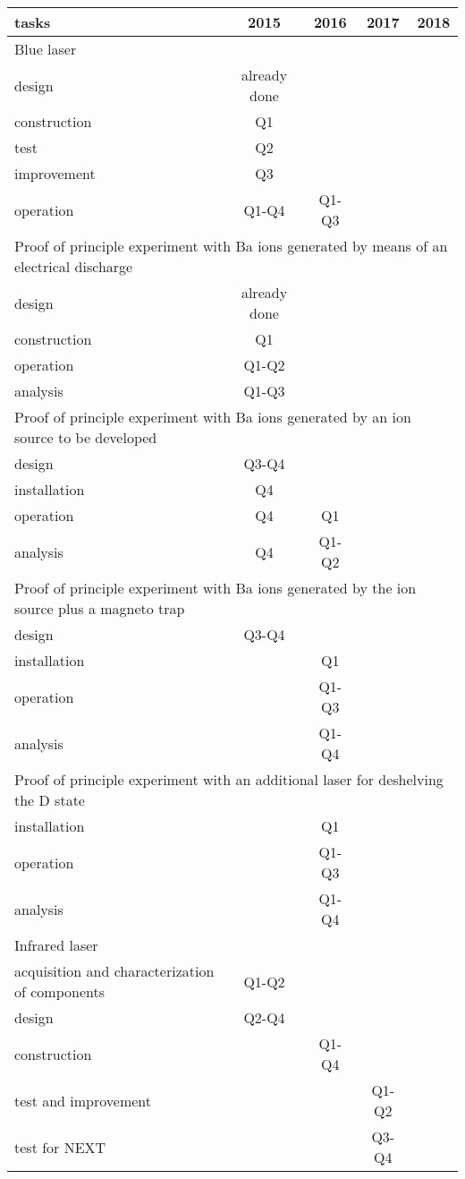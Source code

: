 \begin{center}
\begin{tabular}{| l | c | c | c | c |}
\hline
tasks & 2015 & 2016 & 2017 & 2018 \\
\hline
\hline
\multicolumn{5}{|l|}{Blue laser}  \\
\hline
\hline
design & already done & & &  \\
construction & Q1 & & & \\
test & Q2 & & & \\
improvement  & Q3 & & & \\
operation &  Q1-Q4 & Q1-Q3 & & \\
\hline
\hline
\multicolumn{5}{|l|}{Proof of principle experiment with Ba ions generated by means of an electrical discharge}  \\
\hline
\hline
design & already done & & &  \\
construction  &  Q1 & & & \\
operation &  Q1-Q2 & & & \\
analysis &  Q1-Q3 & & & \\
\hline
\hline
\multicolumn{5}{|l|}{Proof of principle experiment with Ba ions generated by an ion source to be developed}  \\
\hline
\hline
design & Q3-Q4 & & &  \\
installation  &  Q4 & & & \\
operation &  Q4 & Q1 & & \\
analysis &  Q4 & Q1-Q2 & & \\
\hline
\hline
\multicolumn{5}{|l|}{Proof of principle experiment with Ba ions generated by the ion source plus a magneto trap}  \\
\hline
\hline
design & Q3-Q4 & & &  \\
installation  &  & Q1 & & \\
operation &  & Q1-Q3 & & \\
analysis &  & Q1-Q4 & & \\
\hline
\hline
\multicolumn{5}{|l|}{Proof of principle experiment with an additional laser for deshelving the D state}  \\
\hline
\hline
installation  &  & Q1 & & \\
operation &  & Q1-Q3 & & \\
analysis &  & Q1-Q4 & & \\
\hline
\hline
\multicolumn{5}{|l|}{Infrared laser}  \\
\hline
\hline
acquisition and characterization of components  & Q1-Q2 & & &  \\
design  & Q2-Q4  & & & \\
construction &  & Q1-Q4 & & \\
test and improvement &  & & Q1-Q2 & \\
test for NEXT & & & Q3-Q4 & \\
\hline
\end{tabular}
\label{tab:schedule_calibration}
\end{center}

